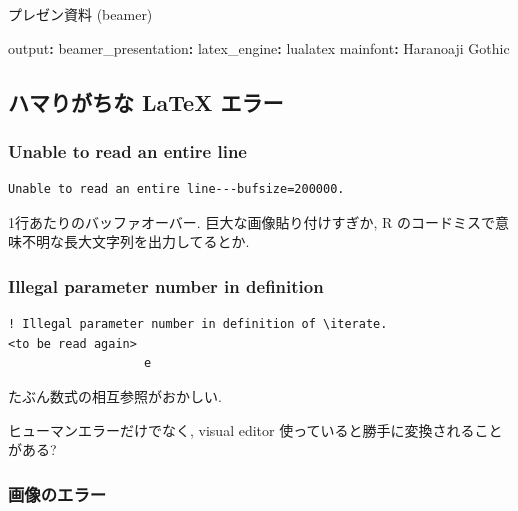 \documentclass[
]{bxjsarticle}
\newenvironment{Shaded}{\begin{snugshade}}{\end{snugshade}}
\newcommand{\AttributeTok}[1]{\textcolor[rgb]{0.77,0.63,0.00}{#1}}
\newcommand{\FunctionTok}[1]{\textcolor[rgb]{0.00,0.00,0.00}{#1}}
\newcommand{\KeywordTok}[1]{\textcolor[rgb]{0.13,0.29,0.53}{\textbf{#1}}}
\begin{document}
プレゼン資料 (beamer)

\begin{Shaded}
\begin{Highlighting}[numbers=left,,]
\FunctionTok{output}\KeywordTok{:}
\AttributeTok{  }\FunctionTok{beamer\_presentation}\KeywordTok{:}
\AttributeTok{    }\FunctionTok{latex\_engine}\KeywordTok{:}\AttributeTok{ lualatex}
\FunctionTok{mainfont}\KeywordTok{:}\AttributeTok{ Haranoaji Gothic}
\end{Highlighting}
\end{Shaded}

\hypertarget{ux30cfux30deux308aux304cux3061ux306a-latex-ux30a8ux30e9ux30fc}{%
\subsection{ハマりがちな LaTeX エラー}\label{ux30cfux30deux308aux304cux3061ux306a-latex-ux30a8ux30e9ux30fc}}

\hypertarget{unable-to-read-an-entire-line}{%
\subsubsection{Unable to read an entire line}\label{unable-to-read-an-entire-line}}

\begin{verbatim}
Unable to read an entire line---bufsize=200000.
\end{verbatim}

1行あたりのバッファオーバー. 巨大な画像貼り付けすぎか, R のコードミスで意味不明な長大文字列を出力してるとか.

\hypertarget{illegal-parameter-number-in-definition}{%
\subsubsection{Illegal parameter number in definition}\label{illegal-parameter-number-in-definition}}

\begin{verbatim}
! Illegal parameter number in definition of \iterate.
<to be read again> 
                   e
\end{verbatim}

たぶん数式の相互参照がおかしい.

ヒューマンエラーだけでなく, visual editor 使っていると勝手に変換されることがある?

\hypertarget{ux753bux50cfux306eux30a8ux30e9ux30fc}{%
\subsubsection{画像のエラー}\label{ux753bux50cfux306eux30a8ux30e9ux30fc}}
\end{document}
